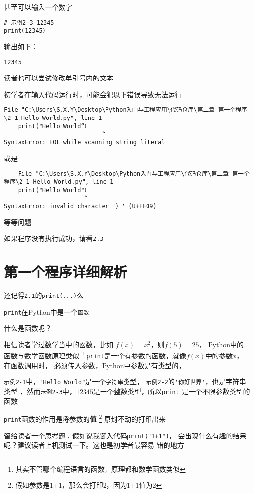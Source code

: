 \documentclass{book}
\begin{document}
甚至可以输入一个数字
\begin{verbatim}
# 示例2-3 12345
print(12345)
\end{verbatim}

输出如下：
\begin{verbatim}
12345
\end{verbatim}

读者也可以尝试修改单引号内的文本

初学者在输入代码运行时，可能会犯以下错误导致无法运行

\begin{verbatim}
File "C:\Users\S.X.Y\Desktop\Python入门与工程应用\代码仓库\第二章 第一个程序\2-1 Hello World.py", line 1
    print("Hello World“）
                            ^
SyntaxError: EOL while scanning string literal

\end{verbatim}

或是
\begin{verbatim}
    File "C:\Users\S.X.Y\Desktop\Python入门与工程应用\代码仓库\第二章 第一个程序\2-1 Hello World.py", line 1
    print("Hello World"）
                       ^
SyntaxError: invalid character '）' (U+FF09)
\end{verbatim}
等等问题


如果程序没有执行成功，请看\verb|2.3|

\section{第一个程序详细解析}
\indent 还记得\verb|2.1|的\verb|print(...)|么

\verb|print|在Python中是一个\verb|函数|

什么是函数呢？

相信读者学过数学当中的函数，比如
$f(x) = x^2$，则$f(5) = 25$，
Python中的函数与数学函数原理类似
\footnote{其实不管哪个编程语言的函数，原理都和数学函数类似}
\verb|print|是一个有参数的函数，就像$f(x)$中的参数$x$，在函数调用时，
必须传入参数，Python中参数是有类型的，

\verb|示例2-1|中，\verb|"Hello World"|是一个\verb|字符串|类型，
\verb|示例2-2|的\verb|'你好世界'|，也是字符串类型
，然而\verb|示例2-3|中，$12345$是一个整数类型，所以\verb|print|
是一个不限参数类型的函数

\verb|print|函数的作用是将参数的\textbf{值}
\footnote{假如参数是1+1，那么会打印2，因为1+1值为2}
原封不动的打印出来

留给读者一个思考题：假如说我键入代码\verb|print("1+1")|，
会出现什么有趣的结果呢？建议读者上机测试一下。这也是初学者最容易
错的地方
\end{document}
